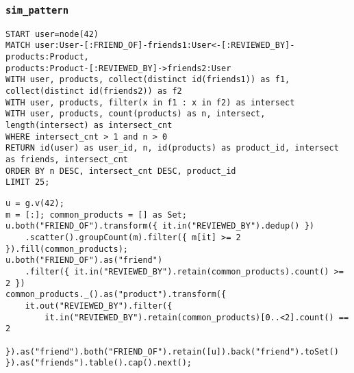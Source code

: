 \subsubsection*{\texttt{sim\_pattern}}

\begin{lstlisting}
START user=node(42)
MATCH user:User-[:FRIEND_OF]-friends1:User<-[:REVIEWED_BY]-products:Product,
products:Product-[:REVIEWED_BY]->friends2:User
WITH user, products, collect(distinct id(friends1)) as f1, collect(distinct id(friends2)) as f2
WITH user, products, filter(x in f1 : x in f2) as intersect
WITH user, products, count(products) as n, intersect, length(intersect) as intersect_cnt
WHERE intersect_cnt > 1 and n > 0
RETURN id(user) as user_id, n, id(products) as product_id, intersect as friends, intersect_cnt
ORDER BY n DESC, intersect_cnt DESC, product_id
LIMIT 25;
\end{lstlisting}

\begin{lstlisting}
u = g.v(42);
m = [:]; common_products = [] as Set;
u.both("FRIEND_OF").transform({ it.in("REVIEWED_BY").dedup() })
	.scatter().groupCount(m).filter({ m[it] >= 2 }).fill(common_products);
u.both("FRIEND_OF").as("friend")
	.filter({ it.in("REVIEWED_BY").retain(common_products).count() >= 2 })
common_products._().as("product").transform({
	it.out("REVIEWED_BY").filter({
		it.in("REVIEWED_BY").retain(common_products)[0..<2].count() == 2
	}).as("friend").both("FRIEND_OF").retain([u]).back("friend").toSet()
}).as("friends").table().cap().next();
\end{lstlisting}



